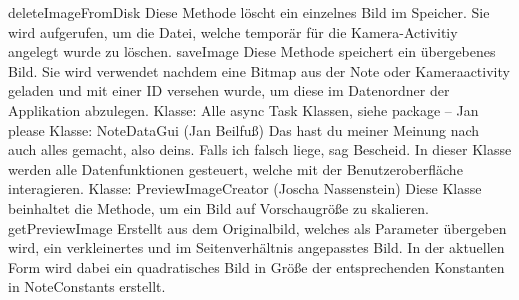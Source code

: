 deleteImageFromDisk
Diese Methode löscht ein einzelnes Bild im Speicher. Sie wird aufgerufen, um die Datei, welche temporär für die Kamera-Activitiy angelegt wurde zu löschen. 
saveImage
 Diese Methode speichert ein übergebenes Bild. Sie wird verwendet nachdem eine Bitmap aus der Note oder Kameraactivity geladen und mit einer ID versehen wurde, um diese im Datenordner der Applikation abzulegen.
Klasse: Alle async Task Klassen, siehe package – Jan please
Klasse: NoteDataGui (Jan Beilfuß)
Das hast du meiner Meinung nach auch alles gemacht, also deins. Falls ich falsch liege, sag Bescheid.
In dieser Klasse werden alle Datenfunktionen gesteuert, welche mit der Benutzeroberfläche interagieren. 
Klasse: PreviewImageCreator (Joscha Nassenstein)
Diese Klasse beinhaltet die Methode, um ein Bild auf Vorschaugröße zu skalieren.
getPreviewImage
Erstellt aus dem Originalbild, welches als Parameter übergeben wird, ein verkleinertes und im Seitenverhältnis angepasstes Bild. In der aktuellen Form wird dabei ein quadratisches Bild in Größe der entsprechenden Konstanten in NoteConstants erstellt.

